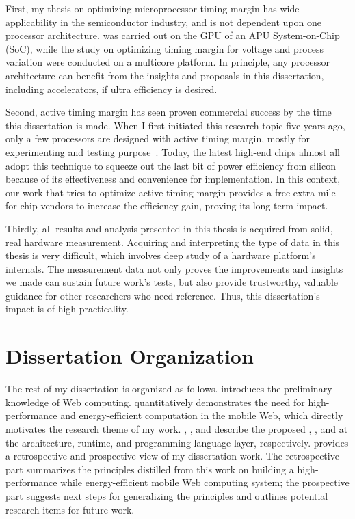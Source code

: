 First, my thesis on optimizing microprocessor timing margin has wide applicability in the semiconductor industry, and is not dependent upon one processor architecture. \tistates was carried out on the GPU of an APU System-on-Chip (SoC), while the study on optimizing timing margin for voltage and process variation were conducted on a multicore platform. In principle, any processor architecture can benefit from the insights and proposals in this dissertation, including accelerators, if ultra efficiency is desired. 

Second, active timing margin has seen proven commercial success by the time this dissertation is made. When I first initiated this research topic five years ago, only a few processors are designed with active timing margin, mostly for experimenting and testing purpose~\cite{lefurgy2011active, bowman201222nm}. Today, the latest high-end chips almost all adopt this technique to squeeze out the last bit of power efficiency from silicon~\cite{tokunaga20145,grenat20145,bowman20158,webel2015robust,vezyrtzis2018droop} because of its effectiveness and convenience for implementation. In this context, our work that tries to optimize active timing margin provides a free extra mile for chip vendors to increase the efficiency gain, proving its long-term impact.

Thirdly, all results and analysis presented in this thesis is acquired from solid, real hardware measurement. Acquiring and interpreting the type of data in this thesis is very difficult, which involves deep study of a hardware platform's internals. The measurement data not only proves the improvements and insights we made can sustain future work's tests, but also provide trustworthy, valuable guidance for other researchers who need reference. Thus, this dissertation's impact is of high practicality.


\section{Dissertation Organization}
\label{sec:intro:outline}

The rest of my dissertation is organized as follows.  introduces the preliminary knowledge of Web computing.  quantitatively demonstrates the need for high-performance and energy-efficient computation in the mobile Web, which directly motivates the research theme of my work. , , and  describe the proposed \webcore, \webrt, and \greenweb at the architecture, runtime, and programming language layer, respectively.  provides a retrospective and prospective view of my dissertation work. The retrospective part summarizes the principles distilled from this work on building a high-performance while energy-efficient mobile Web computing system; the prospective part suggests next steps for generalizing the principles and outlines potential research items for future work.

